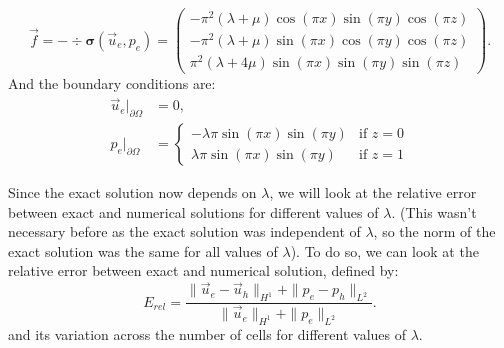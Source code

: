 \documentclass[a4paper,12pt,twoside]{report}
\begin{document}
$$
\vec f = -\div \boldsymbol\sigma(\vec u_e,p_e)=
\begin{pmatrix}
-\pi^{2}(\lambda+\mu)\cos(\pi x)\sin(\pi y)\cos(\pi z)\\[4pt]
-\pi^{2}(\lambda+\mu)\sin(\pi x)\cos(\pi y)\cos(\pi z)\\[4pt]
\pi^{2}(\lambda+4\mu)\sin(\pi x)\sin(\pi y)\sin(\pi z)
\end{pmatrix}.
$$
And the boundary conditions are: 
\begin{align*}
\vec u_e|_{\partial\Omega} &= 0,\\
p_e|_{\partial\Omega} &= \begin{cases}
-\lambda \pi \sin(\pi x) \sin(\pi y) & \text{if } z = 0 \\
\lambda \pi \sin(\pi x) \sin(\pi y) & \text{if } z = 1
\end{cases}
\end{align*}

Since the exact solution now depends on $\lambda$, we will look at the relative error between exact and numerical solutions for different values of $\lambda$. (This wasn't necessary before as the exact solution was independent of $\lambda$, so the norm of the exact solution was the same for all values of $\lambda$).
To do so, we can look at the relative error between exact and numerical solution, defined by: 
$$
E_{rel} = \frac{\|\vec u_e - \vec u_h\|_{H^1} + \|p_e - p_h\|_{L^2}}{\|\vec u_e\|_{H^1} + \|p_e\|_{L^2}}.
$$
and its variation across the number of cells for different values of $\lambda$.
\end{document}
